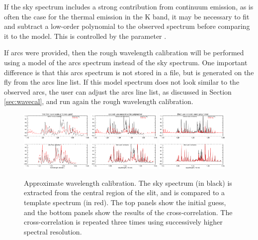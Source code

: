 \documentclass[a4paper]{article}
\begin{document}
\begin{sloppypar}
If the sky spectrum includes a strong contribution from continuum emission, as is often the case for the thermal emission in the K band, it may be necessary to fit and subtract a low-order polynomial to the observed spectrum before comparing it to the model. This is controlled by the parameter .

If arcs were provided, then the rough wavelength calibration will be performed using a model of the arcs spectrum instead of the sky spectrum. One important difference is that this arcs spectrum is not stored in a file, but is generated on the fly from the arcs line list. If this model spectrum does not look similar to the observed arcs, the user can adjust the arcs line list, as discussed in Section \ref{sec:wavecal}, and run again the rough wavelength calibration.


\begin{figure}[tbp]
\begin{minipage}{\textwidth}
   \centering
 \includegraphics[width=0.31\textwidth]{wavecal1}
   \hspace*{0.01\textwidth}
 \includegraphics[width=0.31\textwidth]{wavecal2}
  \hspace*{0.01\textwidth}
 \includegraphics[width=0.31\textwidth]{wavecal3}
\end{minipage}
\caption{Approximate wavelength calibration. The sky spectrum (in black) is extracted from the central region of the slit, and is compared to a template spectrum (in red). The top panels show the initial guess, and the bottom panels show the results of the cross-correlation. The cross-correlation is repeated three times using successively higher spectral resolution.}
\label{fig:wavecal_approx}
\end{figure}



\end{sloppypar}
\end{document}
